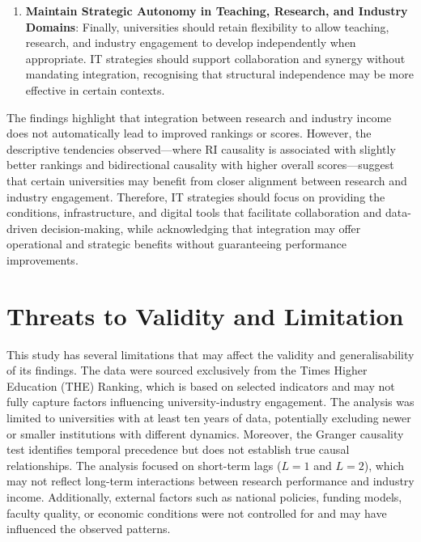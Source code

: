 \documentclass[a4paper, conference]{IEEEtran}
\begin{document}
\begin{enumerate}
	\item \textbf{Maintain Strategic Autonomy in Teaching, Research, and Industry Domains}: Finally, universities should retain flexibility to allow teaching, research, and industry engagement to develop independently when appropriate. IT strategies should support collaboration and synergy without mandating integration, recognising that structural independence may be more effective in certain contexts.
\end{enumerate}

The findings highlight that integration between research and industry income does not automatically lead to improved rankings or scores. However, the descriptive tendencies observed—where RI causality is associated with slightly better rankings and bidirectional causality with higher overall scores—suggest that certain universities may benefit from closer alignment between research and industry engagement. Therefore, IT strategies should focus on providing the conditions, infrastructure, and digital tools that facilitate collaboration and data-driven decision-making, while acknowledging that integration may offer operational and strategic benefits without guaranteeing performance improvements.





\section{Threats to Validity and Limitation}
\label{threads_to_validity_and_limitation}

This study has several limitations that may affect the validity and generalisability of its findings. The data were sourced exclusively from the Times Higher Education (THE) Ranking, which is based on selected indicators and may not fully capture factors influencing university-industry engagement. The analysis was limited to universities with at least ten years of data, potentially excluding newer or smaller institutions with different dynamics. Moreover, the Granger causality test identifies temporal precedence but does not establish true causal relationships. The analysis focused on short-term lags ($L=1$ and $L=2$), which may not reflect long-term interactions between research performance and industry income. Additionally, external factors such as national policies, funding models, faculty quality, or economic conditions were not controlled for and may have influenced the observed patterns.
\end{document}
